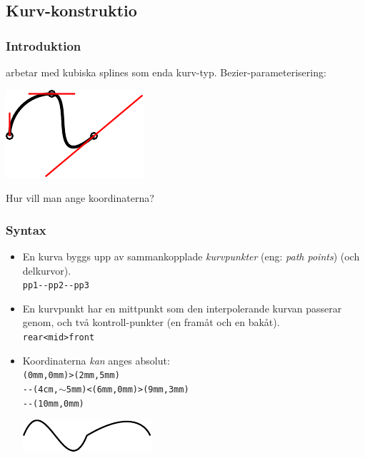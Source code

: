 \documentclass[noamsthm,handout]{beamer}
\newcommand{\inEnglish}[1]{(eng: \emph{#1})}
\begin{document}
\subsection{Kurv-konstruktio}
\begin{frame}\frametitle{Introduktion}
  \Shapes arbetar med kubiska splines som enda kurv-typ.  Bezier-parameterisering:
  \begin{center}
    \includegraphics{figures/spline}
  \end{center}
  Hur vill man ange koordinaterna?
\end{frame}
\begin{frame}\frametitle{Syntax}
  \begin{itemize}
    \item En kurva byggs upp av sammankopplade \emph{kurvpunkter} \inEnglish{path points} (och delkurvor).\\
      \texttt{pp1{\color{red}-{}-}pp2{\color{red}-{}-}pp3}
    \item En kurvpunkt har en mittpunkt som den interpolerande kurvan passerar genom, och två kontroll-punkter (en framåt och en bakåt).\\
      \texttt{rear{\color{red}<}mid{\color{red}>}front}
    \item Koordinaterna \emph{kan} anges absolut:\\
      \texttt{(0mm,0mm)>(2mm,5mm)\\-{}-(4cm,$\sim$5mm)<(6mm,0mm)>(9mm,3mm)\\-{}-(10mm,0mm)}\\
      \begin{center}
        \includegraphics{figures/absolute}        
      \end{center}
  \end{itemize}
\end{frame}
\end{document}

